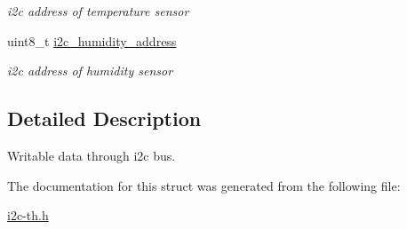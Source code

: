\begin{DoxyCompactItemize}
\begin{DoxyCompactList}\small\item\em i2c address of temperature sensor \end{DoxyCompactList}\item 
\mbox{\label{structwritable__data__t_af7dee4cff91376d89745a86ba747c35f}} 
uint8\+\_\+t \hyperlink{structwritable__data__t_af7dee4cff91376d89745a86ba747c35f}{i2c\+\_\+humidity\+\_\+address}
\begin{DoxyCompactList}\small\item\em i2c address of humidity sensor \end{DoxyCompactList}\end{DoxyCompactItemize}


\subsection{Detailed Description}
Writable data through i2c bus. 

The documentation for this struct was generated from the following file\+:\begin{DoxyCompactItemize}
\item 
\hyperlink{i2c-th_8h}{i2c-\/th.\+h}\end{DoxyCompactItemize}
